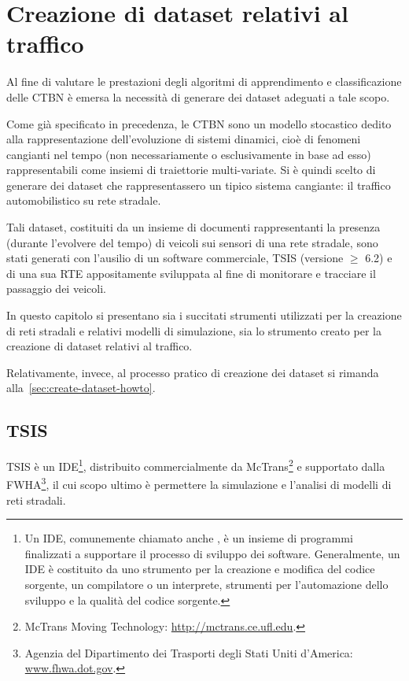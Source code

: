 
\chapter{Creazione di dataset relativi al traffico}
\label{cap:tsis-sensors}
Al fine di valutare le prestazioni degli algoritmi di apprendimento e classificazione delle \acl{CTBN} è emersa la necessità di generare dei dataset adeguati a tale scopo.

Come già specificato in precedenza, le \acs{CTBN} sono un modello stocastico dedito alla rappresentazione dell'evoluzione di sistemi dinamici, cioè di fenomeni cangianti nel tempo (non necessariamente o esclusivamente in base ad esso) rappresentabili come insiemi di traiettorie multi-variate. Si è quindi scelto di generare dei dataset che rappresentassero un tipico sistema cangiante: il traffico automobilistico su rete stradale.

Tali dataset, costituiti da un insieme di documenti rappresentanti la presenza (durante l'evolvere del tempo) di veicoli sui sensori di una rete stradale, sono stati generati con l'ausilio di un software commerciale, \acf{TSIS} (versione $\geq$ 6.2) e di una sua \acl{RTE} appositamente sviluppata al fine di monitorare e tracciare il passaggio dei veicoli. 

In questo capitolo si presentano sia i succitati strumenti utilizzati per la creazione di reti stradali e relativi modelli di simulazione, sia lo strumento creato per la creazione di dataset relativi al traffico.

Relativamente, invece, al processo pratico di creazione dei dataset si rimanda alla~\autoref{sec:create-dataset-howto}.

\section{TSIS}
\label{sec:tsis}
\acf{TSIS} è un \acl{IDE}\footnote{Un \acl{IDE}, comunemente chiamato anche , è un insieme di programmi finalizzati a supportare il processo di sviluppo dei software. Generalmente, un \acs{IDE} è costituito da uno strumento per la creazione e modifica del codice sorgente, un compilatore o un interprete, strumenti per l'automazione dello sviluppo e la qualità del codice sorgente.}, distribuito commercialmente da McTrans\footnote{McTrans Moving Technology: \url{http://mctrans.ce.ufl.edu}.} e supportato dalla \acf{FWHA}\footnote{Agenzia del Dipartimento dei Trasporti degli Stati Uniti d'America: \\ \url{www.fhwa.dot.gov}.}, il cui scopo ultimo è permettere la simulazione e l'analisi di modelli di reti stradali.

